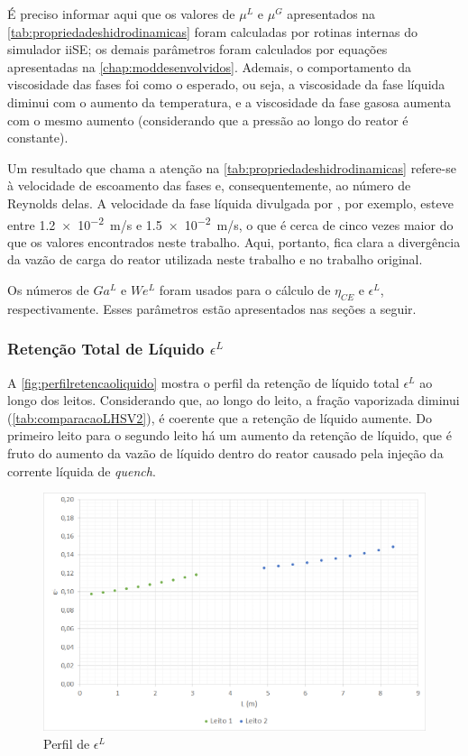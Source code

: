É preciso informar aqui que os valores de $\mu^L$ e $\mu^G$ apresentados na
\autoref{tab:propriedadeshidrodinamicas} foram calculadas por rotinas internas
do simulador iiSE; os demais parâmetros foram calculados por equações
apresentadas na \autoref{chap:moddesenvolvidos}. Ademais, o comportamento da
viscosidade das fases foi como o esperado, ou seja, a viscosidade da fase
líquida diminui com o aumento da temperatura, e a viscosidade da fase gasosa
aumenta com o mesmo aumento (considerando que a pressão ao longo do reator é
constante).

Um resultado que chama a atenção na \autoref{tab:propriedadeshidrodinamicas}
refere-se à velocidade de escoamento das fases e, consequentemente, ao número de
Reynolds delas. A velocidade da fase líquida divulgada por
, por exemplo, esteve entre \SI{1,2e-2}{m/s} e
\SI{1,5e-2}{m/s}, o que é cerca de cinco vezes maior do que os valores
encontrados neste trabalho. Aqui, portanto, fica clara a divergência da vazão de
carga do reator utilizada neste trabalho e no trabalho original.

Os números de $Ga^L$ e $We^L$ foram usados para o cálculo de $\eta_{CE}$ e
$\epsilon^{L}$, respectivamente. Esses parâmetros estão apresentados nas seções
a seguir.

\subsubsection{Retenção Total de Líquido $\epsilon^{L}$}
\label{retencaototaldeliquido}

A \autoref{fig:perfilretencaoliquido} mostra o perfil da retenção de líquido
total $\epsilon^{L}$ ao longo dos leitos. Considerando que, ao longo do leito, a fração vaporizada diminui
(\autoref{tab:comparacaoLHSV2}), é coerente que a retenção de líquido aumente.
Do primeiro leito para o segundo leito há um aumento da retenção de líquido, que
é fruto do aumento da vazão de líquido dentro do reator causado pela injeção da
corrente líquida de \emph{quench}.

\begin{figure}[htb]
\centering
\includegraphics[scale=0.4]{images/Chap4/perfilretencaoliquido.png}
\caption{Perfil de $\epsilon^{L}$}
\label{fig:perfilretencaoliquido}
\end{figure}

